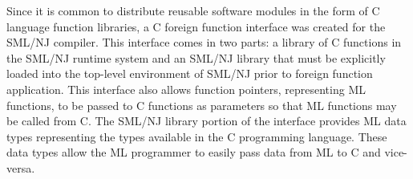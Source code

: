 

Since it is common to distribute reusable software modules in the form of 
C language function libraries, a C foreign function interface was 
created for the SML/NJ compiler. \cite{lorenz}  This interface comes in two 
parts: a library of C functions in the SML/NJ runtime system and an SML/NJ
library that must be explicitly loaded into the top-level environment of 
SML/NJ prior to foreign function application. \cite{lorenz} This interface 
also allows function pointers, representing ML functions, to be passed to 
C functions as parameters so that ML functions may be called from C.   
The SML/NJ library portion of the interface provides ML data types representing
the types available in the C programming language.  These data types allow the 
ML programmer to easily pass data from ML to C and vice-versa.

